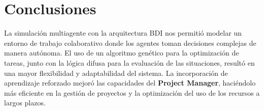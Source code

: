 \documentclass[a4paper, 12pt]{article}
\begin{document}
\section{Conclusiones}

La simulación multiagente con la arquitectura BDI nos permitió modelar un entorno de trabajo colaborativo donde los agentes toman decisiones complejas de manera autónoma. El uso de un algoritmo genético para la optimización de tareas, junto con la lógica difusa para la evaluación de las situaciones, resultó en una mayor flexibilidad y adaptabilidad del sistema. La incorporación de aprendizaje reforzado mejoró las capacidades del \textbf{Project Manager}, haciéndolo más eficiente en la gestión de proyectos y la optimización del uso de los recursos a largos plazos.
\end{document}
